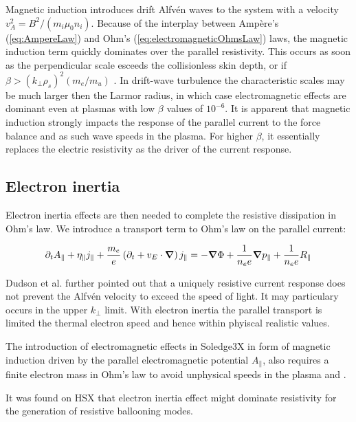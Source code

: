Magnetic induction introduces drift Alfvén waves to the system with a velocity $v_A^2 = B^2/(m_i \mu_0 n_i)$. Because of the interplay between Ampère's (\ref{eq:AmpereLaw}) and Ohm's (\ref{eq:electromagneticOhmsLaw}) laws, the magnetic induction term quickly dominates over the parallel resistivity. This occurs as soon as the perpendicular scale esceeds the collisionless skin depth, or if $\beta > \left(k_\perp\rho_s\right)^2(m_e/m_u)$ \cite{mikhailovskii1963stability}. In drift-wave turbulence the characteristic scales may be much larger then the Larmor radius, in which case electromagnetic effects are dominant even at plasmas with low $\beta$ values of $10^{-6}$\cite{scott1997}. It is apparent that magnetic induction strongly impacts the response of the parallel current to the force balance and as such wave speeds in the plasma. For higher $\beta$, it essentially replaces the electric resistivity as the driver of the current response. \\ 


\subsection{Electron inertia}

Electron inertia effects are then needed to complete the resistive dissipation in Ohm's law. We introduce a transport term to Ohm's law on the parallel current: 

\begin{equation}
	\label{eq:electromagneticElectronInertiaOhmsLaw}
	\partial_t A_\parallel + \eta_\parallel j_\parallel + \frac{m_e}{e}\left(\partial_t + v_E\cdot\grad\right)j_\parallel = -\grad\Phi + \frac{1}{n_ee}\grad p_\parallel + \frac{1}{n_ee}R_\parallel
\end{equation}

Dudson et al.\cite{Dudson2021} further pointed out that a uniquely resistive current response does not prevent the Alfvén velocity to exceed the speed of light. It may particulary occurs in the upper $k_\perp$ limit. With electron inertia the parallel transport is limited the thermal electron speed and hence within phyiscal realistic values.

The introduction of electromagnetic effects in Soledge3X in form of magnetic induction driven by the parallel electromagnetic potential $A_\parallel$, also requires a finite electron mass in Ohm's law to avoid unphysical speeds in the plasma and .


It was found on HSX that electron inertia effect might dominate resistivity for the generation of resistive ballooning modes\cite{rafiq2009unified}.



